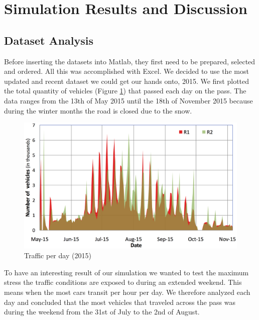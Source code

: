 \documentclass[11pt,a4paper,parskip=half-]{article}
\begin{document}
\clearpage


\section{Simulation Results and Discussion}
\subsection{Dataset Analysis}

Before inserting the datasets into Matlab, they first need to be prepared, selected and ordered. All this was accomplished with Excel. We decided to use the most updated and recent dataset we could get our hands onto, 2015. We first plotted the total quantity of vehicles (Figure \ref{fig:Year}) that passed each day on the pass. The data ranges from the 13th of May 2015 until the 18th of November 2015 because during the winter months the road is closed due to the snow.

\begin{figure}[h!]
\includegraphics[scale=0.75]{Trend_Year}
\centering
\vspace*{-4mm}
\caption{Traffic per day (2015)}
\label{fig:Year}
\end{figure}

To have an interesting result of our simulation we wanted to test the maximum stress the traffic conditions are exposed to during an extended weekend. This means when the most cars transit per hour per day. We therefore analyzed  each day and concluded that the most vehicles that traveled across the pass was during the weekend from the 31st of July to the 2nd of August.
\end{document}
